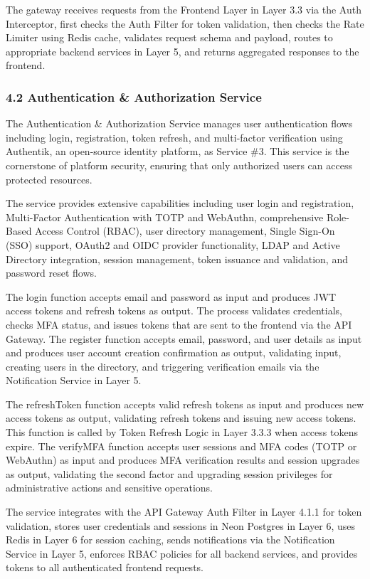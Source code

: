 \documentclass[12pt,a4paper]{report}
\begin{document}
The gateway receives requests from the Frontend Layer in Layer 3.3 via the Auth Interceptor, first checks the Auth Filter for token validation, then checks the Rate Limiter using Redis cache, validates request schema and payload, routes to appropriate backend services in Layer 5, and returns aggregated responses to the frontend.

\subsubsection{4.2 Authentication \& Authorization Service}

The Authentication \& Authorization Service manages user authentication flows including login, registration, token refresh, and multi-factor verification using Authentik, an open-source identity platform, as Service \#3. This service is the cornerstone of platform security, ensuring that only authorized users can access protected resources.

The service provides extensive capabilities including user login and registration, Multi-Factor Authentication with TOTP and WebAuthn, comprehensive Role-Based Access Control (RBAC), user directory management, Single Sign-On (SSO) support, OAuth2 and OIDC provider functionality, LDAP and Active Directory integration, session management, token issuance and validation, and password reset flows.

The login function accepts email and password as input and produces JWT access tokens and refresh tokens as output. The process validates credentials, checks MFA status, and issues tokens that are sent to the frontend via the API Gateway. The register function accepts email, password, and user details as input and produces user account creation confirmation as output, validating input, creating users in the directory, and triggering verification emails via the Notification Service in Layer 5.

The refreshToken function accepts valid refresh tokens as input and produces new access tokens as output, validating refresh tokens and issuing new access tokens. This function is called by Token Refresh Logic in Layer 3.3.3 when access tokens expire. The verifyMFA function accepts user sessions and MFA codes (TOTP or WebAuthn) as input and produces MFA verification results and session upgrades as output, validating the second factor and upgrading session privileges for administrative actions and sensitive operations.

The service integrates with the API Gateway Auth Filter in Layer 4.1.1 for token validation, stores user credentials and sessions in Neon Postgres in Layer 6, uses Redis in Layer 6 for session caching, sends notifications via the Notification Service in Layer 5, enforces RBAC policies for all backend services, and provides tokens to all authenticated frontend requests.
\end{document}
